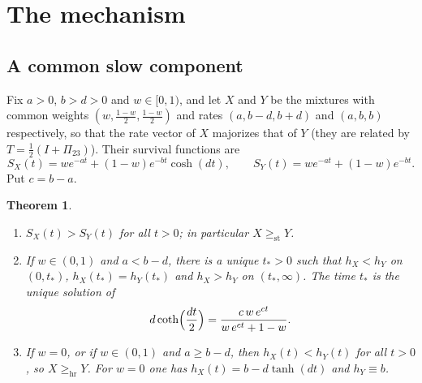 \documentclass[10pt]{article}
\theoremstyle{plain}
\newtheorem{theorem}{Theorem}[section]
\theoremstyle{definition}
\theoremstyle{remark}
\newcommand{\hr}{\mathrm{hr}}
\newcommand{\st}{\mathrm{st}}
\begin{document}
\section{The mechanism}\label{sec:mechanism}

\subsection{A common slow component}

Fix $a>0$, $b>d>0$ and $w\in[0,1)$, and let $X$ and $Y$ be the mixtures with common weights $(w,\tfrac{1-w}{2},\tfrac{1-w}{2})$ and rates $(a,b-d,b+d)$ and $(a,b,b)$ respectively, so that the rate vector of $X$ majorizes that of $Y$ (they are related by $T=\tfrac12(I+\Pi_{23})$). Their survival functions are
\begin{equation}\label{eq:XY}
S_X(t)=we^{-at}+(1-w)e^{-bt}\cosh(dt),\qquad S_Y(t)=we^{-at}+(1-w)e^{-bt}.
\end{equation}
Put $c=b-a$.

\begin{theorem}\label{thm:mechanism}
\begin{enumerate}
\item[(a)] $S_X(t)>S_Y(t)$ for all $t>0$; in particular $X\ge_{\st}Y$.
\item[(b)] If $w\in(0,1)$ and $a<b-d$, there is a unique $t_*>0$ such that $h_X<h_Y$ on $(0,t_*)$, $h_X(t_*)=h_Y(t_*)$ and $h_X>h_Y$ on $(t_*,\infty)$. The time $t_*$ is the unique solution of
\begin{equation}\label{eq:tstar}
d\coth\Bigl(\frac{dt}{2}\Bigr)=\frac{c\,w\,e^{ct}}{w\,e^{ct}+1-w} .
\end{equation}
\item[(c)] If $w=0$, or if $w\in(0,1)$ and $a\ge b-d$, then $h_X(t)<h_Y(t)$ for all $t>0$, so $X\ge_{\hr}Y$. For $w=0$ one has $h_X(t)=b-d\tanh(dt)$ and $h_Y\equiv b$.
\end{enumerate}
\end{theorem}
\end{document}
